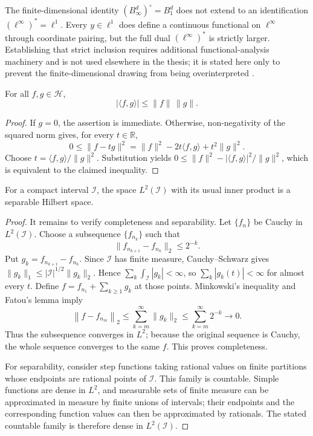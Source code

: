 \begin{remark}
\label{rem:app-linfty-dual}
The finite-dimensional identity $(B_\infty^d)^\circ=B_1^d$ does not extend
to an identification $(\ell^\infty)^*=\ell^1$.  Every $y\in\ell^1$ does
define a continuous functional on $\ell^\infty$ through coordinate pairing,
but the full dual $(\ell^\infty)^*$ is strictly larger.  Establishing that
strict inclusion requires additional functional-analysis machinery and is not
used elsewhere in the thesis; it is stated here only to prevent the
finite-dimensional drawing from being overinterpreted
\parencite{lin_mit_18102_2021}.
\end{remark}

\begin{theorem}
\label{thm:app-cauchy-schwarz}
For all $f,g\in\mathcal H$,
\[
    |\langle f,g\rangle|\leq\|f\|\,\|g\|.
\]
\end{theorem}

\begin{proof}
If $g=0$, the assertion is immediate.  Otherwise, non-negativity of the
squared norm gives, for every $t\in\mathbb R$,
\[
    0\leq\|f-tg\|^2
    =\|f\|^2-2t\langle f,g\rangle+t^2\|g\|^2.
\]
Choose $t=\langle f,g\rangle/\|g\|^2$.  Substitution yields
$0\leq\|f\|^2-|\langle f,g\rangle|^2/\|g\|^2$, which is equivalent to the
claimed inequality.
\end{proof}

\begin{theorem}
\label{thm:app-l2-hilbert}
For a compact interval $\mathcal I$, the space $L^2(\mathcal I)$ with its
usual inner product is a separable Hilbert space.
\end{theorem}

\begin{proof}
It remains to verify completeness and separability.  Let $\{f_n\}$ be Cauchy
in $L^2(\mathcal I)$.  Choose a subsequence $\{f_{n_k}\}$ such that
\[
    \|f_{n_{k+1}}-f_{n_k}\|_2\leq2^{-k}.
\]
Put $g_k=f_{n_{k+1}}-f_{n_k}$.  Since $\mathcal I$ has finite measure,
Cauchy--Schwarz gives
$\|g_k\|_1\leq|\mathcal I|^{1/2}\|g_k\|_2$.  Hence
$\sum_k\int_{\mathcal I}|g_k|<\infty$, so $\sum_k|g_k(t)|<\infty$ for almost
every $t$.  Define $f=f_{n_1}+\sum_{k\geq1}g_k$ at those points.  Minkowski's
inequality and Fatou's lemma imply
\[
 \left\|f-f_{n_m}\right\|_2
 \leq\sum_{k=m}^{\infty}\|g_k\|_2
 \leq\sum_{k=m}^{\infty}2^{-k}\longrightarrow0.
\]
Thus the subsequence converges in $L^2$; because the original sequence is
Cauchy, the whole sequence converges to the same $f$.  This proves
completeness.

For separability, consider step functions taking rational values on finite
partitions whose endpoints are rational points of $\mathcal I$.  This family
is countable.  Simple functions are dense in $L^2$, and measurable sets of
finite measure can be approximated in measure by finite unions of intervals;
their endpoints and the corresponding function values can then be
approximated by rationals.  The stated countable family is therefore dense in
$L^2(\mathcal I)$.
\end{proof}

